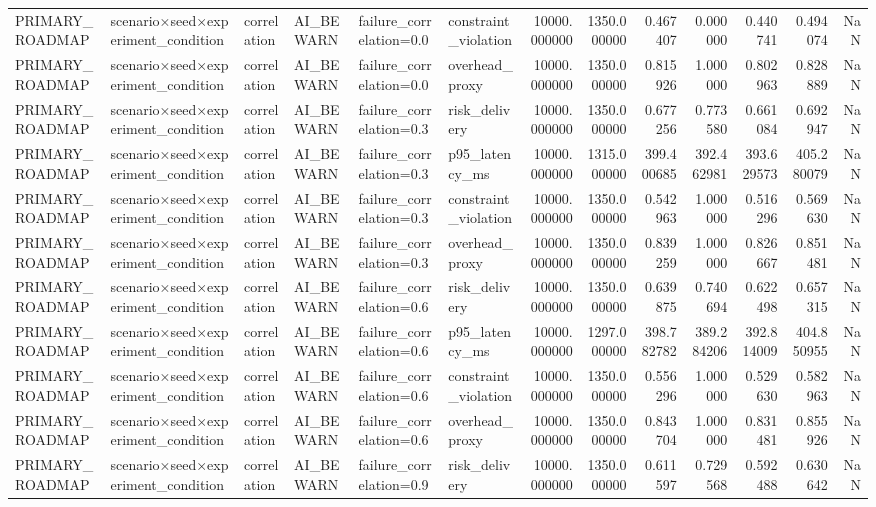 \begin{tabular}{llllllrrrrrrr}
PRIMARY\_ROADMAP & scenario×seed×experiment\_condition & correlation & AI\_BEWARN & failure\_correlation=0.0 & constraint\_violation & 10000.000000 & 1350.000000 & 0.467407 & 0.000000 & 0.440741 & 0.494074 & NaN \\
PRIMARY\_ROADMAP & scenario×seed×experiment\_condition & correlation & AI\_BEWARN & failure\_correlation=0.0 & overhead\_proxy & 10000.000000 & 1350.000000 & 0.815926 & 1.000000 & 0.802963 & 0.828889 & NaN \\
PRIMARY\_ROADMAP & scenario×seed×experiment\_condition & correlation & AI\_BEWARN & failure\_correlation=0.3 & risk\_delivery & 10000.000000 & 1350.000000 & 0.677256 & 0.773580 & 0.661084 & 0.692947 & NaN \\
PRIMARY\_ROADMAP & scenario×seed×experiment\_condition & correlation & AI\_BEWARN & failure\_correlation=0.3 & p95\_latency\_ms & 10000.000000 & 1315.000000 & 399.400685 & 392.462981 & 393.629573 & 405.280079 & NaN \\
PRIMARY\_ROADMAP & scenario×seed×experiment\_condition & correlation & AI\_BEWARN & failure\_correlation=0.3 & constraint\_violation & 10000.000000 & 1350.000000 & 0.542963 & 1.000000 & 0.516296 & 0.569630 & NaN \\
PRIMARY\_ROADMAP & scenario×seed×experiment\_condition & correlation & AI\_BEWARN & failure\_correlation=0.3 & overhead\_proxy & 10000.000000 & 1350.000000 & 0.839259 & 1.000000 & 0.826667 & 0.851481 & NaN \\
PRIMARY\_ROADMAP & scenario×seed×experiment\_condition & correlation & AI\_BEWARN & failure\_correlation=0.6 & risk\_delivery & 10000.000000 & 1350.000000 & 0.639875 & 0.740694 & 0.622498 & 0.657315 & NaN \\
PRIMARY\_ROADMAP & scenario×seed×experiment\_condition & correlation & AI\_BEWARN & failure\_correlation=0.6 & p95\_latency\_ms & 10000.000000 & 1297.000000 & 398.782782 & 389.284206 & 392.814009 & 404.850955 & NaN \\
PRIMARY\_ROADMAP & scenario×seed×experiment\_condition & correlation & AI\_BEWARN & failure\_correlation=0.6 & constraint\_violation & 10000.000000 & 1350.000000 & 0.556296 & 1.000000 & 0.529630 & 0.582963 & NaN \\
PRIMARY\_ROADMAP & scenario×seed×experiment\_condition & correlation & AI\_BEWARN & failure\_correlation=0.6 & overhead\_proxy & 10000.000000 & 1350.000000 & 0.843704 & 1.000000 & 0.831481 & 0.855926 & NaN \\
PRIMARY\_ROADMAP & scenario×seed×experiment\_condition & correlation & AI\_BEWARN & failure\_correlation=0.9 & risk\_delivery & 10000.000000 & 1350.000000 & 0.611597 & 0.729568 & 0.592488 & 0.630642 & NaN \\

\end{tabular}
